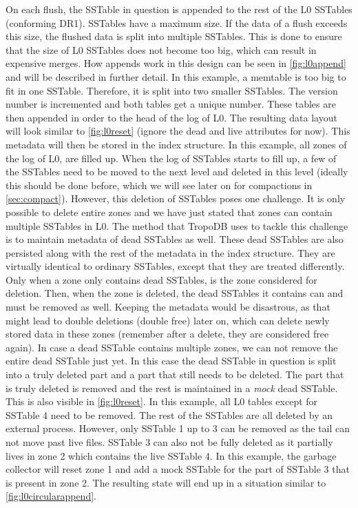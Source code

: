 On each flush, the SSTable in question is appended to the rest of the L0 SSTables (conforming DR1). SSTables have a maximum size. If the data of a flush exceeds this size, the flushed data is split into multiple SSTables. This is done to ensure that the size of L0 SSTables does not become too big, which can result in expensive merges. How appends work in this design can be seen in \autoref{fig:l0append} and will be described in further detail. In this example, a memtable is too big to fit in one SSTable. Therefore, it is split into two smaller SSTables. The version number is incremented and both tables get a unique number. These tables are then appended in order to the head of the log of L0. The resulting data layout will look similar to \autoref{fig:l0reset} (ignore the dead and live attributes for now). This metadata will then be stored in the index structure. In this example, all zones of the log of L0, are filled up. When the log of SSTables starts to fill up, a few of the SSTables need to be moved to the next level and deleted in this level (ideally this should be done before, which we will see later on for compactions in \autoref{sec:compact}). However, this deletion of SSTables poses one challenge. It is only possible to delete entire zones and we have just stated that zones can contain multiple SSTables in L0. The method that TropoDB uses to tackle this challenge is to maintain metadata of dead SSTables as well. These dead SSTables are also persisted along with the rest of the metadata in the index structure. They are virtually identical to ordinary SSTables, except that they are treated differently. Only when a zone only contains dead SSTables, is the zone considered for deletion. Then, when the zone is deleted, the dead SSTables it contains can and must be removed as well. Keeping the metadata would be disastrous, as that might lead to double deletions (double free) later on, which can delete newly stored data in these zones (remember after a delete, they are considered free again). In case a dead SSTable contains multiple zones, we can not remove the entire dead SSTable just yet. In this case the dead SSTable in question is split into a truly deleted part and a part that still needs to be deleted. The part that is truly deleted is removed and the rest is maintained in a \textit{mock} dead SSTable. This is also visible in \autoref{fig:l0reset}. In this example, all L0 tables except for SSTable 4 need to be removed. The rest of the SSTables are all deleted by an external process. However, only SSTable 1 up to 3 can be removed as the tail can not move past live files. SSTable 3 can also not be fully deleted as it partially lives in zone 2 which contains the live SSTable 4. In this example, the garbage collector will reset zone 1 and add a mock SSTable for the part of SSTable 3 that is present in zone 2. The resulting state will end up in a situation similar to \autoref{fig:l0circularappend}. 

